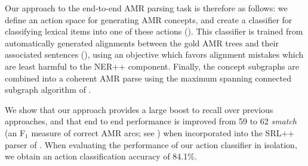 \documentclass[11pt]{article}
\newcommand\w[1]{\textit{#1}} %
\newcommand\n[1]{\textit{#1}} %
\begin{document}

%

Our approach to the end-to-end AMR parsing task is therefore as follows:
  we define an action space for generating AMR concepts, and create a classifier
  for classifying lexical items into one of these actions ().
This classifier is trained from automatically generated alignments between the
  gold AMR trees and their associated sentences (), using an
  objective which favors alignment mistakes which are least harmful to the NER++
  component.
Finally, the concept subgraphs are combined into a coherent AMR parse using the
  maximum spanning connected subgraph algorithm of .


We show that our approach provides a large boost to recall over previous approaches, and that end to end performance is improved from 59 to 62 \n{smatch} (an F$_1$ measure of correct AMR arcs; see ) when incorporated into the SRL++ parser of .
When evaluating the performance of our action classifier in isolation, we obtain
  an action classification accuracy of 84.1\%.
\end{document}

